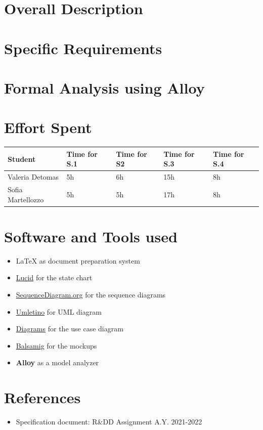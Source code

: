 \documentclass{article}
\begin{document}
\newpage
\section{Overall Description}


\newpage
\section{Specific Requirements}


\newpage
\section{Formal Analysis using Alloy}



\newpage 
\section{Effort Spent}
\begin{table}[h]
      \centering
      \begin{tabular}{|p{3cm}||p{2cm}|p{2cm}|p{2cm}|p{2cm}|}
            \hline
            Student & Time for S.1 & Time for S2 & Time for S.3 & Time for S.4\\
            \hline
            Valeria Detomas & 5h & 6h & 15h & 8h\\
            \hline
            Sofia Martellozzo & 5h & 5h & 17h & 8h\\
            \hline
      \end{tabular}
\end{table}

\section{Software and Tools used}
\begin{itemize}
      \item \LaTeX{} as document preparation system
      \item \href{https://lucid.co/}{Lucid} for the state chart 
      \item \href{https://sequencediagram.org}{SequenceDiagram.org} for the sequence diagrams
      \item \href{http://www.umletino.com/umletino.html}{Umletino} for UML diagram 
      \item \href{https://app.diagrams.net/}{Diagrams} for the use case diagram 
      \item \href{https://balsamiq.com}{Balsamig} for the mockups 
      \item \textbf{Alloy} as a model analyzer
\end{itemize}


\section{References}
\begin{itemize}
      \item Specification document: R\&DD Assignment A.Y. 2021-2022
\end{itemize}
\end{document}
